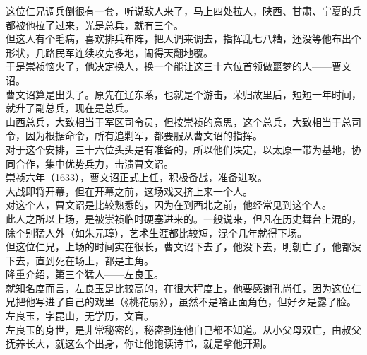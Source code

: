 \begin{multicols}{\theparacolNo}
这位仁兄调兵倒很有一套，听说敌人来了，马上四处拉人，陕西、甘肃、宁夏的兵都被他拉了过来，光是总兵，就有三个。\\

但这人有个毛病，喜欢排兵布阵，把人调来调去，指挥乱七八糟，还没等他布出个形状，几路民军连续攻克多地，闹得天翻地覆。\\

于是崇祯恼火了，他决定换人，换一个能让这三十六位首领做噩梦的人——曹文诏。\\

曹文诏算是出头了。原先在辽东系，也就是个游击，荣归故里后，短短一年时间，就升了副总兵，现在是总兵。\\

山西总兵，大致相当于军区司令员，但按崇祯的意思，这个总兵，大致相当于总司令，因为根据命令，所有追剿军，都要服从曹文诏的指挥。\\

对于这个安排，三十六位头头是有准备的，所以他们决定，以太原一带为基地，协同合作，集中优势兵力，击溃曹文诏。\\

崇祯六年（1633），曹文诏正式上任，积极备战，准备进攻。\\

大战即将开幕，但在开幕之前，这场戏又挤上来一个人。\\

对这个人，曹文诏是比较熟悉的，因为在到西北之前，他经常见到这个人。\\

此人之所以上场，是被崇祯临时硬塞进来的。一般说来，但凡在历史舞台上混的，除个别猛人外（如朱元璋），艺术生涯都比较短，混个几年就得下场。\\

但这位仁兄，上场的时间实在很长，曹文诏下去了，他没下去，明朝亡了，他都没下去，直到死在场上，都是主角。\\

隆重介绍，第三个猛人——左良玉。\\

就知名度而言，左良玉是比较高的，在很大程度上，他要感谢孔尚任，因为这位仁兄把他写进了自己的戏里（《桃花扇》），虽然不是啥正面角色，但好歹是露了脸。\\

左良玉，字昆山，无学历，文盲。\\

左良玉的身世，是非常秘密的，秘密到连他自己都不知道。从小父母双亡，由叔父抚养长大，就这么个出身，你让他饱读诗书，就是拿他开涮。\\


\end{multicols}

